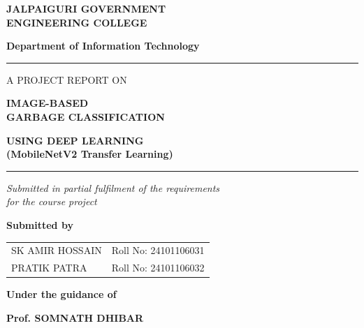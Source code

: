 \begin{titlepage}
\thispagestyle{empty}

\centering
\setlength{\parskip}{0pt}
\vspace*{0cm}
{\LARGE\bfseries JALPAIGURI GOVERNMENT\\ENGINEERING COLLEGE\par}
\vspace{0.4cm}
{\large\bfseries Department of Information Technology\par}

\vspace{0.7cm}
\rule{0.75\textwidth}{1pt}

\vspace{0.6cm}
{\large A PROJECT REPORT ON\par}
\vspace{0.7cm}
{\fontsize{24}{30}\selectfont\bfseries IMAGE-BASED\\GARBAGE CLASSIFICATION\par}
\vspace{0.5cm}
{\large\bfseries USING DEEP LEARNING\\(MobileNetV2 Transfer Learning)\par}

\vspace{0.7cm}
\rule{0.75\textwidth}{1pt}

\vspace{0.6cm}
{\normalsize\itshape Submitted in partial fulfilment of the requirements\\for the course project\par}

\vspace{0.7cm}
{\large\bfseries Submitted by\par}
\vspace{0.3cm}
{\Large\bfseries
\begin{tabular}{ll}
  SK AMIR HOSSAIN & Roll No: 24101106031 \\[8pt]
  PRATIK PATRA    & Roll No: 24101106032
\end{tabular}\par}

\vspace{0.7cm}
{\large\bfseries Under the guidance of\par}
\vspace{0.3cm}
{\large\bfseries Prof. SOMNATH DHIBAR\par}
\vfill
\end{titlepage}
